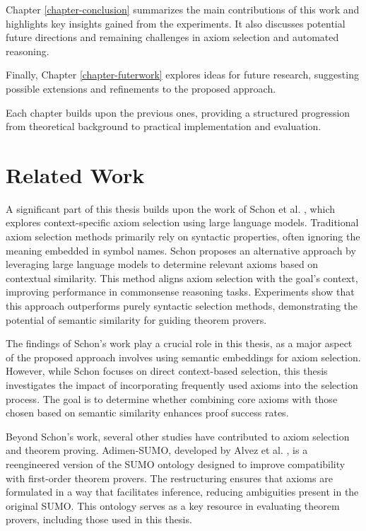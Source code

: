 \documentclass[english,version-2020-11]{uzl-thesis}
\begin{document}
Chapter \ref{chapter-conclusion} summarizes the main contributions of this work and highlights key insights gained from the experiments. It also discusses potential future directions and remaining challenges in axiom selection and automated reasoning.

Finally, Chapter \ref{chapter-futerwork} explores ideas for future research, suggesting possible extensions and refinements to the proposed approach.

Each chapter builds upon the previous ones, providing a structured progression from theoretical background to practical implementation and evaluation.


\chapter{Related Work}
\label{chapter-relatedwork}

A significant part of this thesis builds upon the work of Schon et al. \cite{Schon2024}, which explores context-specific axiom selection using large language models. Traditional axiom selection methods primarily rely on syntactic properties, often ignoring the meaning embedded in symbol names. Schon proposes an alternative approach by leveraging large language models to determine relevant axioms based on contextual similarity. This method aligns axiom selection with the goal's context, improving performance in commonsense reasoning tasks. Experiments show that this approach outperforms purely syntactic selection methods, demonstrating the potential of semantic similarity for guiding theorem provers.

The findings of Schon's work play a crucial role in this thesis, as a major aspect of the proposed approach involves using semantic embeddings for axiom selection. However, while Schon focuses on direct context-based selection, this thesis investigates the impact of incorporating frequently used axioms into the selection process. The goal is to determine whether combining core axioms with those chosen based on semantic similarity enhances proof success rates.

Beyond Schon's work, several other studies have contributed to axiom selection and theorem proving. Adimen-SUMO, developed by Alvez et al. \cite{Alvez2014}, is a reengineered version of the SUMO ontology designed to improve compatibility with first-order theorem provers. The restructuring ensures that axioms are formulated in a way that facilitates inference, reducing ambiguities present in the original SUMO. This ontology serves as a key resource in evaluating theorem provers, including those used in this thesis.
\end{document}
